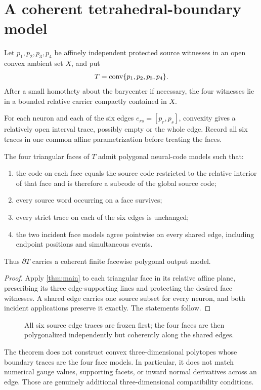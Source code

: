\section{A coherent tetrahedral-boundary model}\label{sec:tetra}

Let $p_1,p_2,p_3,p_4$ be affinely independent protected source witnesses in
an open convex ambient set $X$, and put
\[
 T=\operatorname{conv}\{p_1,p_2,p_3,p_4\}.
\]
After a small homothety about the barycenter if necessary, the four witnesses
lie in a bounded relative carrier compactly contained in $X$.

For each neuron and each of the six edges $e_{rs}=[p_r,p_s]$, convexity gives
a relatively open interval trace, possibly empty or the whole edge.  Record
all six traces in one common affine parametrization before treating the
faces.

\begin{theorem}\label{thm:tetra}
The four triangular faces of $T$ admit polygonal neural-code models such
that:
\begin{enumerate}
\item the code on each face equals the source code restricted to the relative
      interior of that face and is therefore a subcode of the global source
      code;
\item every source word occurring on a face survives;
\item every strict trace on each of the six edges is unchanged;
\item the two incident face models agree pointwise on every shared edge,
      including endpoint positions and simultaneous events.
\end{enumerate}
Thus $\partial T$ carries a coherent finite facewise polygonal output model.
\end{theorem}

\begin{proof}
Apply \cref{thm:main} to each triangular face in its relative affine plane,
prescribing its three edge-supporting lines and protecting the desired face
witnesses.  A shared edge carries one source subset for every neuron, and
both incident applications preserve it exactly.  The statements follow.
\end{proof}

\begin{figure}[t]
\centering

\caption{All six source edge traces are frozen first; the four faces are then
polygonalized independently but coherently along the shared edges.}
\label{fig:tetrahedron}
\end{figure}

\begin{remark}
The theorem does not construct convex three-dimensional polytopes whose
boundary traces are the four face models.  In particular, it does not match
numerical gauge values, supporting facets, or inward normal derivatives
across an edge.  Those are genuinely additional three-dimensional
compatibility conditions.
\end{remark}
